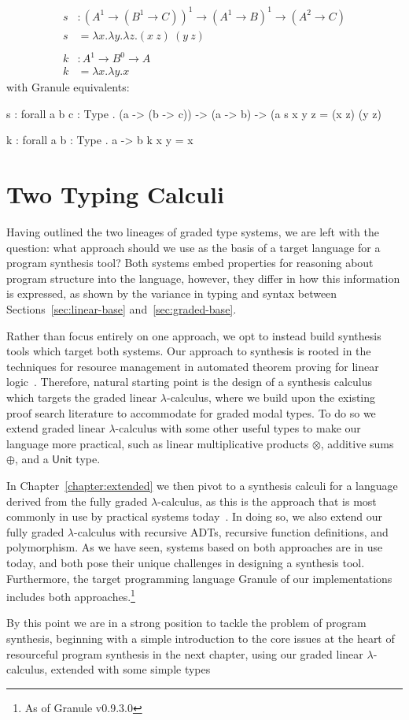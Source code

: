 \begin{example}
\begin{align*}
s & : (A^1 \rightarrow (B^1 \rightarrow C))^1 \rightarrow (A^1 \rightarrow B)^1 \rightarrow (A^2 \rightarrow C) \\
s & = \lambda x . \lambda y . \lambda z . (x\ z)\ (y\ z)\\
\\
k & : A^1 \rightarrow B^0 \rightarrow A \\
k & = \lambda x . \lambda y . x 
\end{align*}
with Granule equivalents:
\begin{granule}
s : forall { a b c : Type } 
  . (a -> (b -> c)) -> (a -> b) -> (a %
s x y z = (x z) (y z)

k : forall { a b : Type } . a -> b %
k x y = x 
\end{granule}
\end{example}



\section{Two Typing Calculi}
\label{sec:two-typing}
Having outlined the two lineages of graded type systems, we are left with the
question: what approach should we use as the basis of a target language for a
program synthesis tool? Both systems embed properties for reasoning about
program structure into the language, however, they differ in how this
information is expressed, as shown by the variance in typing and syntax between
Sections~\ref{sec:linear-base} and~\ref{sec:graded-base}. 

Rather than focus entirely on one approach, we opt to instead build synthesis
tools which target both systems. Our approach to synthesis is rooted in the
techniques for resource management in automated theorem proving for linear
logic~\citep{HODAS1994327, CERVESATO2000133}. Therefore, natural starting point
is the design of a synthesis calculus which targets the graded linear
$\lambda$-calculus, where we build upon the existing proof search literature to
accommodate for graded modal types. To do so we extend graded linear
$\lambda$-calculus with some other useful types to make our language more
practical, such as linear multiplicative products $\otimes$, additive sums
$\oplus$, and a $\mathsf{Unit}$ type.

In Chapter~\ref{chapter:extended} we then pivot to a synthesis calculi for a
language derived from the fully graded $\lambda$-calculus, as this is the
approach that is most commonly in use by practical systems
today~\citep{DBLP:journals/corr/abs-2104-00480,
DBLP:journals/pacmpl/BernardyBNJS18}. In doing so, we also extend our fully graded
$\lambda$-calculus with recursive ADTs, recursive function definitions, and
polymorphism. As we have seen, systems based on both approaches are in use
today, and both pose their unique challenges in designing a synthesis tool.
Furthermore, the target programming language Granule of our implementations
includes both approaches.\footnote{As of Granule v0.9.3.0}

By this point we are in a strong position to tackle the problem of program
synthesis, beginning with a simple introduction to the core issues at the heart
of resourceful program synthesis in the next chapter, using our graded linear
$\lambda$-calculus, extended with some simple types 
